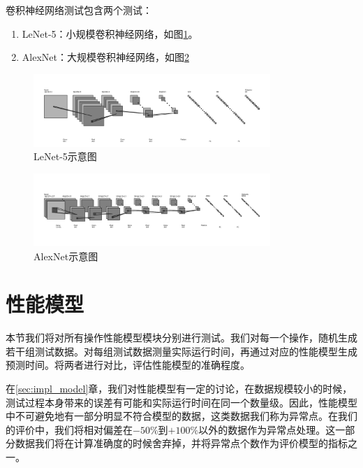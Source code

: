    卷积神经网络测试包含两个测试：
    
    \begin{enumerate}
        \item LeNet-5：小规模卷积神经网络，如图\ref{fig:lenet5_str}。
        \item AlexNet：大规模卷积神经网络，如图\ref{fig:alexnet_str}
    \end{enumerate}
    
    \begin{figure}[!htbp]
        \centering
        \includegraphics[width=0.8\textwidth]{figures/lenet5_str.png}
        \caption{LeNet-5示意图}
        \label{fig:lenet5_str}
    \end{figure}

    \begin{figure}[!htbp]
        \centering
        \includegraphics[width=0.8\textwidth]{figures/alexnet_str.png}
        \caption{AlexNet示意图}
        \label{fig:alexnet_str}
    \end{figure}

\section{性能模型}
    本节我们将对所有操作性能模型模块分别进行测试。我们对每一个操作，随机生成若干组测试数据。对每组测试数据测量实际运行时间，再通过对应的性能模型生成预测时间。将两者进行对比，评估性能模型的准确程度。
    
    在\ref{sec:impl_model}章，我们对性能模型有一定的讨论，在数据规模较小的时候，测试过程本身带来的误差有可能和实际运行时间在同一个数量级。因此，性能模型中不可避免地有一部分明显不符合模型的数据，这类数据我们称为异常点。在我们的评价中，我们将相对偏差在$ -50\% $到$ +100\% $以外的数据作为异常点处理。这一部分数据我们将在计算准确度的时候舍弃掉，并将异常点个数作为评价模型的指标之一。
    
